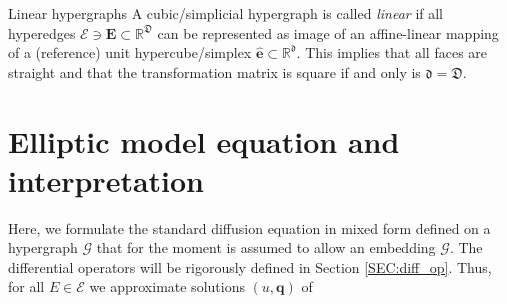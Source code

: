 \documentclass[a4paper, english, 12pt, reqno, draft]{amsart}
\makeatletter
\theoremstyle{definition}
\theoremstyle{remark}
\numberwithin{equation}{section}
\newcommand{\graph}{\ensuremath{\mathcal G}}
\newcommand{\setEdge}{\ensuremath{\mathcal E}}
\newcommand{\edge}{\ensuremath{E}}
\newcommand{\Graph}{\ensuremath{\boldsymbol{\mathcal G}}}
\newcommand{\SetEdge}{\ensuremath{\boldsymbol{\mathcal E}}}
\newcommand{\Edge}{{\ensuremath{\boldsymbol E}}}
\newcommand{\RefEdge}{{\ensuremath{\widehat{\boldsymbol e}}}}
\newcommand{\locDim}{\ensuremath{\mathfrak d}}
\newcommand{\globDim}{\ensuremath{\mathfrak D}}
\newcommand{\IR}{\ensuremath{\mathbb R}}
\renewcommand{\vec}[1]{\ensuremath{\boldsymbol{#1}}}
\def\paragraph{\@startsection{paragraph}{4}%
  \z@\z@{-\fontdimen2\font}%
  {\normalfont\scshape}}
\makeatother
\begin{document}
\paragraph{Linear hypergraphs}
% 
A cubic/simplicial hypergraph is called \emph{linear} if all hyperedges $\SetEdge \ni \Edge \subset \IR^\globDim$ can be represented as image of an affine-linear mapping of a (reference) unit hypercube/simplex $\RefEdge \subset \IR^\locDim$. This implies that all faces are straight and that the transformation matrix is square if and only is $\locDim = \globDim$.
% 
\section{Elliptic model equation and interpretation}\label{SEC:model_eq}
% 
Here, we formulate the standard diffusion equation in mixed form defined on a hypergraph $\graph$ that for the moment is assumed to allow an embedding $\Graph$. The differential operators will be rigorously defined in Section \ref{SEC:diff_op}. Thus, for all $\edge \in \setEdge$ we approximate solutions $(u, \vec q)$ of
% 
\end{document}

